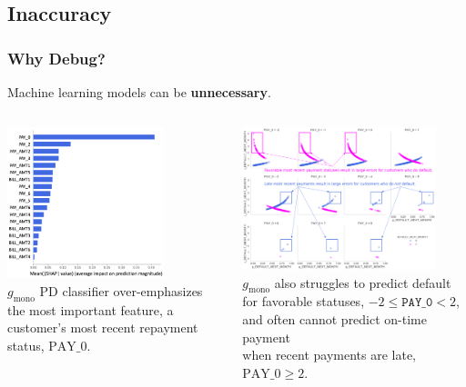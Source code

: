 \documentclass[11pt,
               aspectratio=169,
               hyperref={colorlinks}
               ]{beamer}
\begin{document}
		\subsection{Inaccuracy}

			\begin{frame}
		
				\frametitle{Why Debug?}
		
					\footnotesize{Machine learning models can be \textbf{unnecessary}.}
					\begin{columns}
				
						\centering
						\includegraphics[height=125pt]{img/global_shap.png}\\
						\vspace{5pt}
						\tiny{$g_{\text{mono}}$ PD classifier over-emphasizes the most important feature, a customer's most recent repayment status, $\text{PAY\_0}$.}

						\vspace{11pt}
						\centering
						\includegraphics[height=118pt]{img/resid.png}\\
						\vspace{7pt}
						\tiny{$g_{\text{mono}}$ also struggles to predict default for favorable statuses, $-2  \leq \texttt{PAY\_0}  < 2$, and often cannot predict on-time payment\\when recent payments are late, $\text{PAY\_0} \geq 2$}.
				
					\end{columns}
					\normalsize
			
			\end{frame}
	
\end{document}
